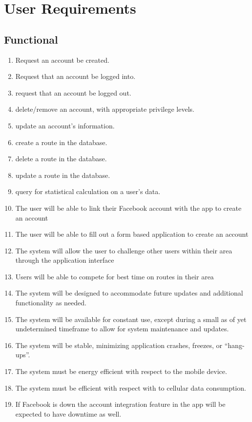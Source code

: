 \documentclass{article}
\begin{document}
\section{User Requirements}
\subsection{Functional}
\begin{enumerate}
    \item Request an account be created.
    \item Request that an account be logged into.
    \item request that an account be logged out.
    \item delete/remove an account, with appropriate privilege levels.
    \item update an account's information.
    \item create a route in the database.
    \item delete a route in the database.
    \item update a route in the database.
    \item query for statistical calculation on a user's data.
    \item The user will be able to link their Facebook account with the app to create an account
    \item The user will be able to fill out a form based application to create an account
    \item The system will allow the user to challenge other users within their area through the application interface
    \item Users will be able to compete for best time on routes in their area
    \item The system will be designed to accommodate future updates and additional functionality as needed.
    \item The system will be available for constant use, except during a small as of yet undetermined timeframe to allow for system maintenance and updates.
    \item The system will be stable, minimizing application crashes, freezes, or “hang-ups”.
    \item The system must be energy efficient with respect to the mobile device.
    \item The system must be efficient with respect with to cellular data consumption.
    \item If Facebook is down the account integration feature in the app will be expected to have downtime as well.

\end{enumerate}
\end{document}
